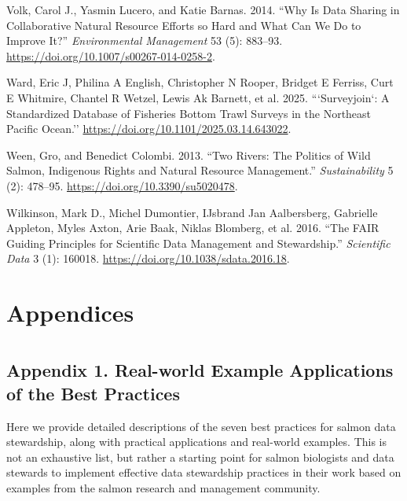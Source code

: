 \documentclass[
  letterpaper,
  DIV=11,
  numbers=noendperiod]{scrartcl}
\newlength{\cslhangindent}
\newenvironment{CSLReferences}[2] %
 {\begin{list}{}{%
  \setlength{\itemindent}{0pt}
  \setlength{\leftmargin}{0pt}
  \setlength{\parsep}{0pt}
  \ifodd #1
   \setlength{\leftmargin}{\cslhangindent}
   \setlength{\itemindent}{-1\cslhangindent}
  \fi
  \setlength{\itemsep}{#2\baselineskip}}}
 {\end{list}}
\begin{document}
\begin{CSLReferences}{1}{0}
Volk, Carol J., Yasmin Lucero, and Katie Barnas. 2014. {``Why Is Data
Sharing in Collaborative Natural Resource Efforts so Hard and What Can
We Do to Improve It?''} \emph{Environmental Management} 53 (5): 883--93.
\url{https://doi.org/10.1007/s00267-014-0258-2}.

Ward, Eric J, Philina A English, Christopher N Rooper, Bridget E
Ferriss, Curt E Whitmire, Chantel R Wetzel, Lewis Ak Barnett, et al.
2025. {```Surveyjoin`: {A} {Standardized} {Database} of {Fisheries}
{Bottom} {Trawl} {Surveys} in the {Northeast} {Pacific} {Ocean}.''}
\url{https://doi.org/10.1101/2025.03.14.643022}.

Ween, Gro, and Benedict Colombi. 2013. {``Two Rivers: The Politics of
Wild Salmon, Indigenous Rights and Natural Resource Management.''}
\emph{Sustainability} 5 (2): 478--95.
\url{https://doi.org/10.3390/su5020478}.

Wilkinson, Mark D., Michel Dumontier, IJsbrand Jan Aalbersberg,
Gabrielle Appleton, Myles Axton, Arie Baak, Niklas Blomberg, et al.
2016. {``The FAIR Guiding Principles for Scientific Data Management and
Stewardship.''} \emph{Scientific Data} 3 (1): 160018.
\url{https://doi.org/10.1038/sdata.2016.18}.

\end{CSLReferences}

\section{Appendices}\label{appendices}

\section{}\label{section}

\subsection{Appendix 1. Real-world Example Applications of the Best
Practices}\label{appendix-1.-real-world-example-applications-of-the-best-practices}

Here we provide detailed descriptions of the seven best practices for
salmon data stewardship, along with practical applications and
real-world examples. This is not an exhaustive list, but rather a
starting point for salmon biologists and data stewards to implement
effective data stewardship practices in their work based on examples
from the salmon research and management community.
\end{document}
